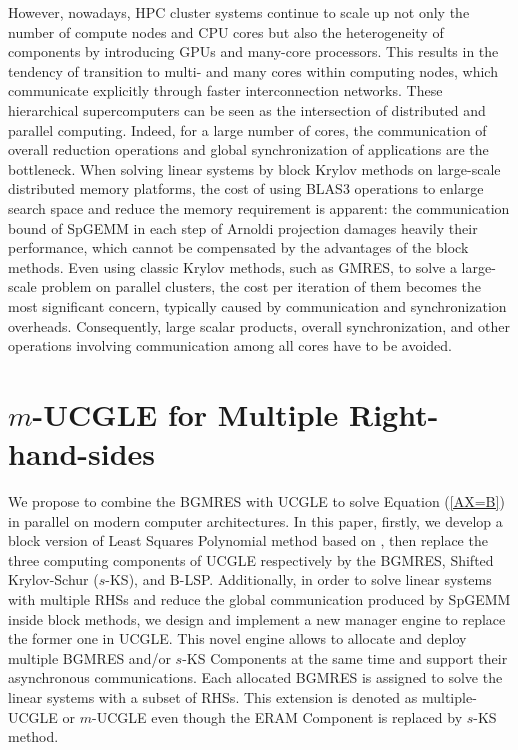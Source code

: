However, nowadays, HPC cluster systems continue to scale up not only the number of compute nodes and CPU cores but also the heterogeneity of components by introducing GPUs and many-core processors. This results in the tendency of transition to multi- and many cores within computing nodes, which communicate explicitly through faster interconnection networks. These hierarchical supercomputers can be seen as the intersection of distributed and parallel computing. Indeed, for a large number of cores, the communication of overall reduction operations and global synchronization of applications are the bottleneck. When solving linear systems by block Krylov methods on large-scale distributed memory platforms, the cost of using BLAS3 operations to enlarge search space and reduce the memory requirement is apparent: the communication bound of SpGEMM in each step of Arnoldi projection damages heavily their performance, which cannot be compensated by the advantages of the block methods. Even using classic Krylov methods, such as GMRES, to solve a large-scale problem on parallel clusters, the cost per iteration of them becomes the most significant concern, typically caused by communication and synchronization overheads. Consequently, large scalar products, overall synchronization, and other operations involving communication among all cores have to be avoided. 


\section{$m$-UCGLE for Multiple Right-hand-sides}

We propose to combine the BGMRES \cite{vital1990etude} with UCGLE \cite{wu2018distributed} to solve Equation (\ref{AX=B}) in parallel on modern computer architectures. In this paper, firstly, we develop a block version of Least Squares Polynomial method based on \cite{saad1987least}, then replace the three computing components of UCGLE respectively by the BGMRES, Shifted Krylov-Schur ($s$-KS), and B-LSP. Additionally, in order to solve linear systems with multiple RHSs and reduce the global communication produced by SpGEMM inside block methods, we design and implement a new manager engine to replace the former one in UCGLE. This novel engine allows to allocate and deploy multiple BGMRES and/or $s$-KS Components at the same time and support their asynchronous communications. Each allocated BGMRES is assigned to solve the linear systems with a subset of RHSs. This extension is denoted as multiple-UCGLE or $m$-UCGLE even though the ERAM Component is replaced by $s$-KS method. 

